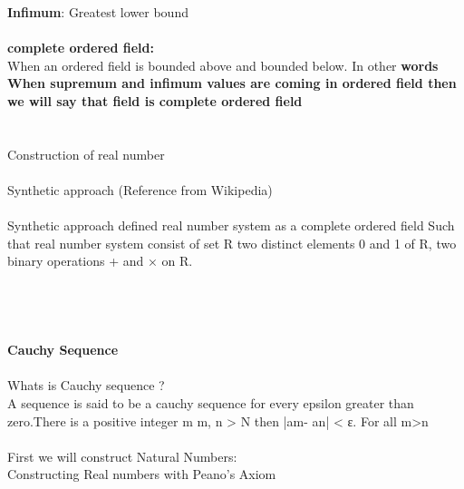 \documentclass{article}
\begin{document}
\textbf{Infimum}:  Greatest lower  bound  \\
\\
\textbf{complete ordered field:
}\\
When an ordered field is bounded above and bounded below. In other \textbf{words When supremum and infimum  values are coming in ordered field then we will say that field is complete ordered field}
\\
\\
\\
Construction of real number\\
\\
Synthetic approach (Reference from Wikipedia)\\
\\
Synthetic approach defined real number system as a complete ordered field 
Such that real number system consist of set R two distinct elements 0 and 1 of R, two binary operations + and × on R.\\
\\
\\
\\
\\
\textbf{Cauchy Sequence }\\
\\
Whats is Cauchy sequence ?\\
A sequence is said to be a cauchy sequence  for every epsilon greater than zero.There is a positive integer m          m, n > N then |am- an| < ε. For all m>n \\
\\
First we will construct Natural Numbers:
\\
Constructing Real numbers with Peano’s Axiom
\\
\vspace{5mm} %
\end{document}
